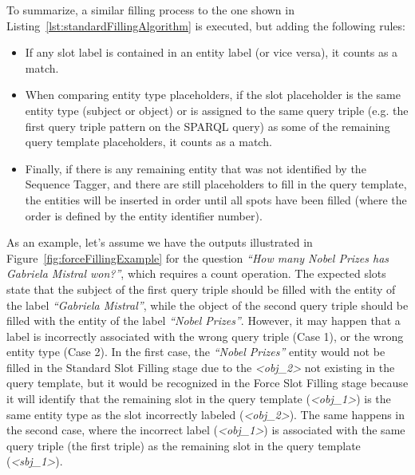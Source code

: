 To summarize, a similar filling process to the one shown in Listing~\ref{lst:standardFillingAlgorithm} 
is executed, but adding the following rules:
\begin{itemize}
    \item If any slot label is contained in an entity label (or vice versa), it counts as a 
    match.
    \item When comparing entity type placeholders, if the slot placeholder is the same entity 
    type (subject or object) or is assigned to the same query triple (e.g. the first query 
    triple pattern on the SPARQL query) as some of the remaining query template placeholders, 
    it counts as a match.
    \item Finally, if there is any remaining entity that was not identified by the Sequence 
    Tagger, and there are still placeholders to fill in the query template, the entities will 
    be inserted in order until all spots have been filled (where the order is defined by the 
    entity identifier number).
\end{itemize}

As an example, let’s assume we have the outputs illustrated in Figure~\ref{fig:forceFillingExample} 
for the question \textit{“How many Nobel Prizes has Gabriela Mistral won?”}, which requires a 
count operation. The expected slots state that the subject of the first query triple should 
be filled with the entity of the label \textit{“Gabriela Mistral”}, while the object of the 
second query triple should be filled with the entity of the label \textit{“Nobel Prizes”}. 
However, it may happen that a label is incorrectly associated with the wrong query triple 
(Case 1), or the wrong entity type (Case 2). In the first case, the \textit{“Nobel Prizes”} 
entity would not be filled in the Standard Slot Filling stage due to the \textit{<obj\_2>} 
not existing in the query template, but it would be recognized in the Force Slot Filling 
stage because it will identify that the remaining slot in the query template (\textit{<obj\_1>}) 
is the same entity type as the slot incorrectly labeled (\textit{<obj\_2>}). The same happens 
in the second case, where the incorrect label (\textit{<obj\_1>}) is associated with the same 
query triple (the first triple) as the remaining slot in the query template (\textit{<sbj\_1>}).

